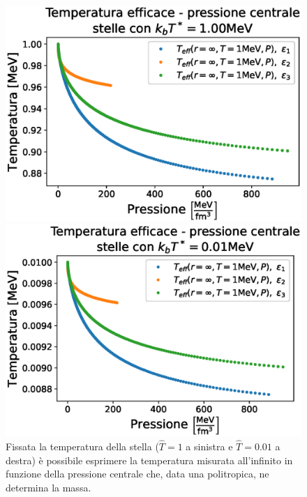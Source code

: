 \documentclass[a4paper, titlepage]{article}
\begin{document}
\begin{figure}[h]
    \begin{minipage}{0.49 \textwidth}
        \centering
        \includegraphics[width = \textwidth]{Figures/Teff1.00_su_P.eps}
    \end{minipage}
    \begin{minipage}{0.49 \textwidth}
        \centering
        \includegraphics[width = \textwidth]{Figures/Teff0.01_su_P.eps}
    \end{minipage}
    \caption{Fissata la temperatura della stella ($\hat T = 1$ a sinistra e
    $\hat T = 0.01$ a destra) è possibile esprimere la temperatura misurata
    all'infinito in funzione della pressione centrale che, data una
    politropica, ne determina la massa.}
\end{figure}
\end{document}

